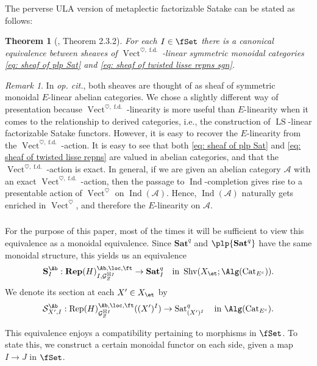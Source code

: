 \documentclass[10pt]{amsart}
\newcommand{\sssec}{\subsubsection}
\newtheorem{thm}[subsubsection]{Theorem}
\theoremstyle{remark}
\newtheorem{rmk}[subsubsection]{Remark}
\newcommand{\te}{\text}
\newcommand{\on}{\operatorname}
\newcommand{\cA}{\mathcal{A}}
\newcommand{\cG}{\mathcal{G}}
\newcommand{\cS}{\mathcal{S}}
\newcommand{\Cat}{\on{Cat}}
\newcommand{\CatEc}{\Cat_{E^c}}
\newcommand{\Rep}{\on{Rep}}
\newcommand{\Vect}{\on{Vect}}
\newcommand{\Shv}{\on{Shv}}
\newcommand{\LS}{\on{LS}}
\newcommand{\Sat}{\on{Sat}}
\DeclareMathOperator{\Ind}{Ind}
\newcommand{\VectAbfd}{\Vect^{\heartsuit,\on{f.d.}}}
\begin{document}
\sssec{}
The perverse ULA version of metaplectic factorizable Satake can be stated as follows:

\begin{thm}[\cite{ZhaoNew}, Theorem 2.3.2]\label{thm: factorizable Satake}
    For each $I\in\fSet$ there is a canonical equivalence between sheaves of $\VectAbfd$-linear symmetric monoidal categories \eqref{eq: sheaf of plp Sat} and \eqref{eq: sheaf of twisted lisse repns sgn}.
\end{thm}

\begin{rmk}\label{rmk: action vs linearity}
    In \emph{op. cit.}, both sheaves are thought of as sheaf of symmetric monoidal $E$-linear abelian categories. We chose a slightly different way of presentation because $\VectAbfd$-linearity is more useful than $E$-linearity when it comes to the relationship to derived categories, i.e., the construction of $\LS$-linear factorizable Satake functors. However, it is easy to recover the $E$-linearity from the $\VectAbfd$-action. It is easy to  see that both \eqref{eq: sheaf of plp Sat} and \eqref{eq: sheaf of twisted lisse repns} are valued in abelian categories, and that the $\VectAbfd$-action is exact. In general, if we are given an abelian category $\cA$ with an exact $\VectAbfd$-action, then the passage to $\Ind$-completion gives rise to a presentable action of $\Vect^{\heartsuit}$ on $\Ind(\cA)$. Hence, $\Ind(\cA)$ naturally gets enriched in $\Vect^{\heartsuit}$, and therefore the $E$-linearity on $\cA$.
\end{rmk}

\sssec{}\label{sssec: monoidal formulation of PULA Satake}
For the purpose of this paper, most of the times it will be sufficient to view this equivalence as a monoidal equivalence. Since $\mathbf{Sat}^q$ and $\plp{\mathbf{Sat}^q}$ have the same monoidal structure, this yields us an equivalence
\begin{equation}\label{eq: perverse ULA Satake sheafy}
    \textbf{S}^{\Ab}_{I}: \mathbf{Rep}(H)^{\Ab,\loc,\ft}_{I,\cG_Z^{\boxtimes I}} \rightarrow \textbf{Sat}^q_{I}\quad\te{in }\Shv(X_{\et};\Alg(\CatEc)).
\end{equation}
We denote its section at each $X'\in X_{\et}$ by
\[\cS^{\Ab}_{X',I}: \Rep(H)^{\Ab,\loc,\ft}_{\cG_Z^{\boxtimes I}}((X')^I) \rightarrow \Sat^q_{(X')^I} \quad \te{in }\Alg(\CatEc).\]

This equivalence enjoys a compatibility pertaining to morphisms in $\fSet$. To state this, we construct a certain monoidal functor on each side, given a map $I\rightarrow J$ in $\fSet$.
\end{document}
